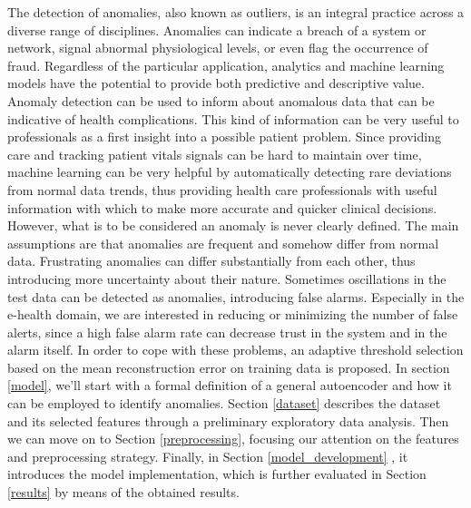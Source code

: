 \documentclass{article}
\begin{document}
\begin{multicols*}{2}
The detection of anomalies, also known as outliers, is an integral practice across a diverse range of disciplines. Anomalies can indicate a breach of a system or network, signal abnormal physiological levels, or even flag the occurrence of fraud. Regardless of the particular application, analytics and machine learning models have the potential to provide both predictive and descriptive value. Anomaly detection can be used to inform about anomalous data that can be indicative of health complications. This kind of information can be very useful to professionals as a first insight into a possible patient problem. Since providing care and tracking patient vitals signals can be hard to maintain over time, machine learning can be very helpful by automatically detecting rare deviations from normal data trends, thus providing health care professionals with useful information with which to make more accurate and quicker clinical decisions. However, what is to be considered an anomaly is never clearly defined. The main assumptions are that anomalies are frequent and somehow differ from normal data. Frustrating anomalies can differ substantially from each other, thus introducing more uncertainty about their nature. Sometimes oscillations in the test data can be detected as anomalies, introducing false alarms. Especially in the e-health domain, we are interested in reducing or minimizing the number of false alerts, since a high false alarm rate can decrease trust in the system and in the alarm itself. In order to cope with these problems, an adaptive threshold selection based on the mean reconstruction error on training data is proposed.
In section \ref{model}, we’ll start with a formal definition of a general autoencoder and how it can be employed to identify anomalies. Section \ref{dataset} describes the dataset and its selected features through a preliminary exploratory data analysis. Then we can move on to Section \ref{preprocessing}, focusing our attention on the features and preprocessing strategy. Finally, in Section \ref{model_development} , it introduces the model implementation, which is further evaluated in Section  \ref{results}  by means of the obtained results.
		



\end{multicols*}
\end{document}
